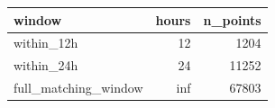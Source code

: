 \begin{tabular}{lrr}
\toprule
window & hours & n_points \\
\midrule
within_12h & 12 & 1204 \\
within_24h & 24 & 11252 \\
full_matching_window & inf & 67803 \\
\bottomrule
\end{tabular}
